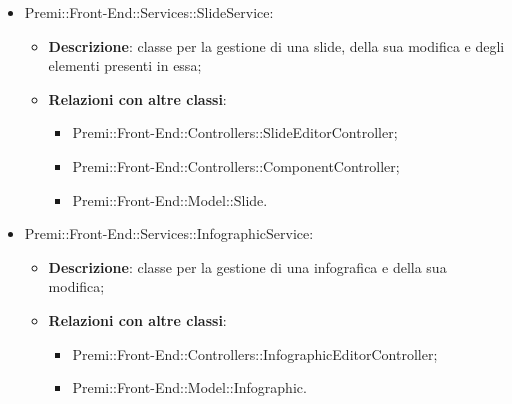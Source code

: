 \begin{itemize}
    \item Premi::Front-End::Services::SlideService:
	\begin{itemize}
		\item \textbf{Descrizione}: classe per la gestione di una slide, della sua modifica e degli elementi presenti in essa;
		\item \textbf{Relazioni con altre classi}:
		\begin{itemize}
			\item Premi::Front-End::Controllers::SlideEditorController;
			\item Premi::Front-End::Controllers::ComponentController;
			\item Premi::Front-End::Model::Slide.
		\end{itemize}
	\end{itemize}

    \item Premi::Front-End::Services::InfographicService:
	\begin{itemize}
		\item \textbf{Descrizione}: classe per la gestione di una infografica e della sua modifica;
		\item \textbf{Relazioni con altre classi}:
		\begin{itemize}
			\item Premi::Front-End::Controllers::InfographicEditorController;
			\item Premi::Front-End::Model::Infographic.
		\end{itemize}
	\end{itemize}

\end{itemize}
